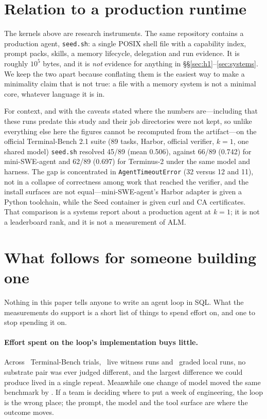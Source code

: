 \documentclass[11pt,a4paper]{article}
\begin{document}
\section{Relation to a production runtime}
\label{sec:seed}

The kernels above are research instruments. The same repository contains a
production agent, \texttt{seed.sh}: a single POSIX shell file with a capability
index, prompt packs, skills, a memory lifecycle, delegation and run evidence.
It is roughly $10^5$ bytes, and it is \emph{not} evidence for anything in
\S\S\ref{sec:h1}--\ref{sec:systems}. We keep the two apart because conflating
them is the easiest way to make a minimality claim that is not true: a file
with a memory system is not a minimal core, whatever language it is in.

For context, and with the caveats stated where the numbers are---including
that these runs predate this study and their job directories were not
kept, so unlike everything else here the figures cannot be recomputed from
the artifact---on the official
Terminal-Bench 2.1 suite (89 tasks, Harbor, official verifier, $k{=}1$, one
shared model) \texttt{seed.sh} resolved 45/89 (mean 0.506), against 66/89
(0.742) for mini-SWE-agent and 62/89 (0.697) for Terminus-2 under the same
model and harness. The gap is concentrated in \texttt{AgentTimeoutError}
(32 versus 12 and 11), not in a collapse of correctness among work that reached
the verifier, and the install surfaces are not equal---mini-SWE-agent's Harbor
adapter is given a Python toolchain, while the Seed container is given curl and
CA certificates. That comparison is a systems report about a production agent
at $k{=}1$; it is not a leaderboard rank, and it is not a measurement of ALM.

\section{What follows for someone building one}
\label{sec:implications}

Nothing in this paper tells anyone to write an agent loop in SQL. What the
measurements do support is a short list of things to spend effort on, and one
to stop spending it on.

\paragraph{Effort spent on the loop's implementation buys little.}
Across \tbarmtrials\ Terminal-Bench trials, \subruns\ live witness runs and
\localn\ graded local runs, no substrate pair was ever judged different, and
the largest difference we could produce lived in a single repeat. Meanwhile one
change of model moved the same benchmark by \modeldiff. If a team is deciding
where to put a week of engineering, the loop is the wrong place; the prompt,
the model and the tool surface are where the outcome moves.
\end{document}
